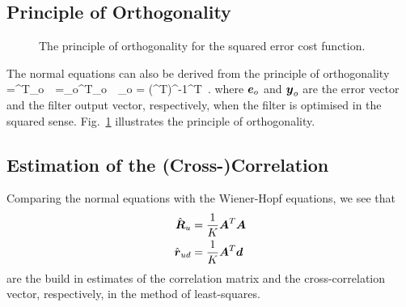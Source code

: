 \subsection{Principle of Orthogonality}
\begin{figure}
  \centering
  \caption{The principle of orthogonality for the squared error cost function.}
  \label{fig:orthogonality_principle}
\end{figure}
The normal equations can also be derived from the principle of orthogonality
\bmath
  =^T_o\ \iff\ =_o^T_o\ \iff\ _o = (^T)^{-1}^T\ .
\emath
where $\boldsymbol{e}_o$ and $\boldsymbol{y}_o$ are the error vector and the filter output vector, respectively, when the filter is optimised in the squared sense. Fig.~\ref{fig:orthogonality_principle} illustrates the principle of orthogonality.

\subsection{Estimation of the (Cross-)Correlation}
Comparing the normal equations with the Wiener-Hopf equations, we see that
\begin{align}
  \hat{\boldsymbol{R}}_u &= \frac{1}{K}\boldsymbol{A}^T\boldsymbol{A}\label{eq:ls_Ru_est}\\
  \hat{\boldsymbol{r}}_{ud} &= \frac{1}{K}\boldsymbol{A}^T\boldsymbol{d}\label{eq:ls_rud_est}
\end{align}
are the build in estimates of the correlation matrix and the cross-correlation vector, respectively, in the method of least-squares.

